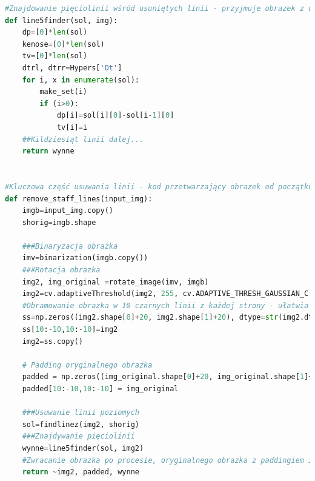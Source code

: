 \documentclass[12pt]{article}
\begin{document}
\begin{lstlisting}[language=Python]
#Znajdowanie pięciolinii wśród usuniętych linii - przyjmuje obrazek z usuniętymi liniami(img) i ich miejscami w obrazku(sol), zwraca miejsca występowania pięciolinii i ich parametry - szczególności wysokość pięciolinii i grubość linii, korzystając między innymi ze struktury zbiorów rozłącznych.
def line5finder(sol, img):
	dp=[0]*len(sol)
	kenose=[0]*len(sol)
	tv=[0]*len(sol)
	dtrl, dtrr=Hypers['Dt']
	for i, x in enumerate(sol):
		make_set(i)
		if (i>0):
			dp[i]=sol[i][0]-sol[i-1][0]
			tv[i]=i
	##Kildziesiąt linii dalej...
	return wynne
	
	
#Kluczowa część usuwania linii - kod przetwarzający obrazek od początku, zwracający obrazek z usuniętymi liniami.
def remove_staff_lines(input_img):
	imgb=input_img.copy()
	shorig=imgb.shape
	
	###Binaryzacja obrazka
	imv=binarization(imgb.copy())
	###Rotacja obrazka
	img2, img_original =rotate_image(imv, imgb)
	img2=cv.adaptiveThreshold(img2, 255, cv.ADAPTIVE_THRESH_GAUSSIAN_C, cv.THRESH_BINARY, Hypers['Binarization_conn'], 1)
	#Obramowanie obrazka w 10 czarnych linii z każdej strony - ułatwia dalsze przetwarzanie
	ss=np.zeros((img2.shape[0]+20, img2.shape[1]+20), dtype=str(img2.dtype))
	ss[10:-10,10:-10]=img2
	img2=ss.copy()
	
	# Padding oryginalnego obrazka
	padded = np.zeros((img_original.shape[0]+20, img_original.shape[1]+20), dtype=str(img_original.dtype))
	padded[10:-10,10:-10] = img_original
	
	###Usuwanie linii poziomych
	sol=findlinez(img2, shorig)
	###Znajdywanie pięciolinii 
	wynne=line5finder(sol, img2)
	#Zwracanie obrazka po procesie, oryginalnego obrazka z paddingiem i parametrów pięciolinii
	return ~img2, padded, wynne



\end{lstlisting}

\clearpage
\end{document}
